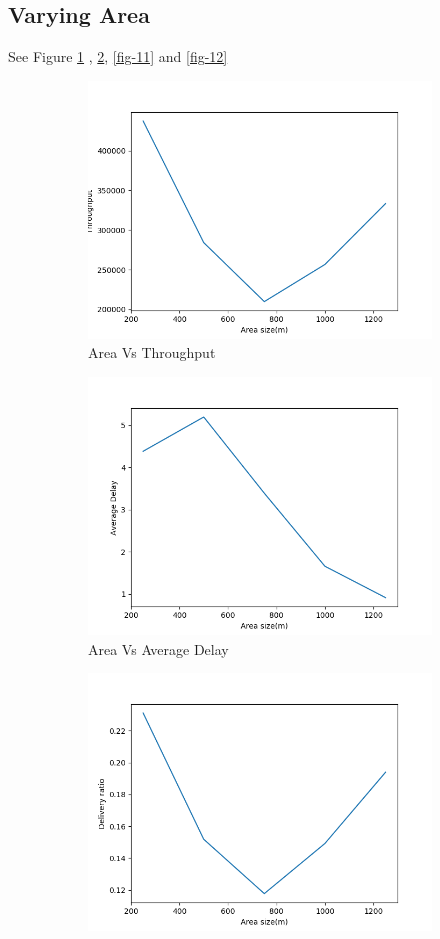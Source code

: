 \documentclass[14pt]{scrartcl} %
\begin{document}
\subsection{Varying Area}
See Figure \ref{fig-9} , \ref{fig-10}, \ref{fig-11} and \ref{fig-12}
\begin{figure}[h]
    \begin{subfigure}{.5\textwidth}
    \centering
    \includegraphics[width=.8\linewidth]{Graph/areaVsThroughput.png}
    \caption{Area Vs Throughput}
    \label{fig-9}
\end{subfigure}
\begin{subfigure}{.5\textwidth}
    \centering
    \includegraphics[width=.8\linewidth]{Graph/areaVsAverageDelay.png}
    \caption{Area Vs Average Delay}
    \label{fig-10}
\end{subfigure}
\begin{subfigure}{.5\textwidth}
    \centering
    \includegraphics[width=.8\linewidth]{Graph/areaVsDeliveryRatio.png}

\end{subfigure}
\end{figure}
\end{document}
